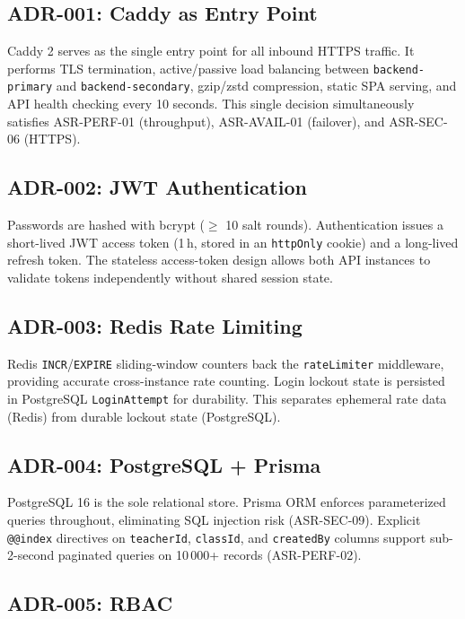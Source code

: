 \documentclass[12pt,a4paper]{article}
\begin{document}
\subsection{ADR-001: Caddy as Entry Point}

Caddy 2 serves as the single entry point for all inbound HTTPS traffic. It performs TLS termination, active/passive load balancing between \texttt{backend-primary} and \texttt{backend-secondary}, gzip/zstd compression, static SPA serving, and API health checking every 10 seconds. This single decision simultaneously satisfies ASR-PERF-01 (throughput), ASR-AVAIL-01 (failover), and ASR-SEC-06 (HTTPS).

\subsection{ADR-002: JWT Authentication}

Passwords are hashed with bcrypt ($\geq$ 10 salt rounds). Authentication issues a short-lived JWT access token (1\,h, stored in an \texttt{httpOnly} cookie) and a long-lived refresh token. The stateless access-token design allows both API instances to validate tokens independently without shared session state.

\subsection{ADR-003: Redis Rate Limiting}

Redis \texttt{INCR}/\texttt{EXPIRE} sliding-window counters back the \texttt{rateLimiter} middleware, providing accurate cross-instance rate counting. Login lockout state is persisted in PostgreSQL \texttt{LoginAttempt} for durability. This separates ephemeral rate data (Redis) from durable lockout state (PostgreSQL).

\subsection{ADR-004: PostgreSQL + Prisma}

PostgreSQL 16 is the sole relational store. Prisma ORM enforces parameterized queries throughout, eliminating SQL injection risk (ASR-SEC-09). Explicit \texttt{@@index} directives on \texttt{teacherId}, \texttt{classId}, and \texttt{createdBy} columns support sub-2-second paginated queries on 10\,000+ records (ASR-PERF-02).

\subsection{ADR-005: RBAC}
\end{document}
